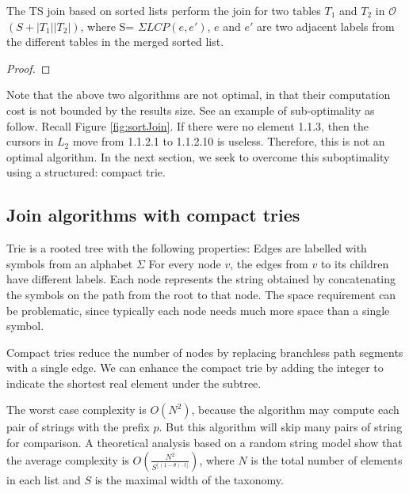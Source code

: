 \begin{theorem} The TS join based on sorted lists perform the join for two tables $T_1$ and $T_2$ in $\mathcal{O}$$(S+|T_1||T_2|)$, where S= $\Sigma LCP(e,e')$, $e$ and $e'$ are two adjacent labels from the different tables in the merged sorted list.
\end{theorem}
\begin{proof}
\end{proof}

Note that the above two algorithms are not optimal, in that their computation cost is not bounded by the results size. See an example of sub-optimality as follow. Recall Figure \ref{fig:sortJoin}. If there were no element 1.1.3, then the cursors in $L_2$ move from 1.1.2.1 to 1.1.2.10 is useless. Therefore, this is not an optimal algorithm. In the next section, we seek to overcome this suboptimality using a structured: compact trie.

\subsection{Join algorithms with compact tries}

 Trie is a rooted tree with the following properties: Edges are labelled with symbols from an alphabet $\Sigma$
For every node $v$, the edges from $v$ to its children have different labels. Each node represents the string obtained by concatenating the symbols on the path from the root to that node. The space requirement can be problematic, since typically each node needs
much more space than a single symbol.

Compact tries reduce the number of nodes by replacing branchless path segments with a single edge.
We can enhance the compact trie by adding the integer to indicate the shortest real element under the subtree.


The worst case complexity is $O(N^2)$, because the algorithm may compute each pair of strings with the prefix $p$. But this algorithm will skip many pairs of string for comparison. A theoretical analysis based on a random string model show that the average complexity is $O(\frac{N^2}{S^{\lfloor (1-\theta) \cdot l \rfloor}})$, where $N$ is the total number of elements in each list and $S$ is the maximal width of the taxonomy.





